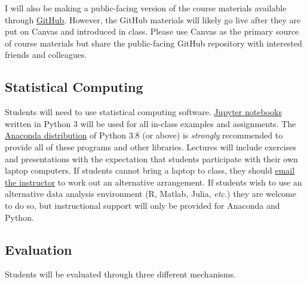 \documentclass[11pt]{memoir}
\begin{document}
I will also be making a public-facing version of the course materials available through \href{https://github.com/cuinfoscience/INFO5613-Fall2021}{GitHub}. However, the GitHub materials will likely go live after they are put on Canvas and introduced in class. Please use Canvas as the primary source of course materials but share the public-facing GitHub repository with interested friends and colleagues.

\subsection{Statistical Computing}
Students will need to use statistical computing software. \href{http://jupyter.org/}{Jupyter notebooks} written in Python 3 will be used for all in-class examples and assignments. The \href{https://www.continuum.io/why-anaconda}{Anaconda distribution} of Python 3.8 (or above) is \textit{strongly} recommended to provide all of these programs and other libraries. Lectures will include exercises and presentations with the expectation that students participate with their own laptop computers. If students cannot bring a laptop to class, they should \href{mailto:brian.keegan@colorado.edu}{email the instructor} to work out an alternative arrangement. If students wish to use an alternative data analysis environment (R, Matlab, Julia, \textit{etc.}) they are welcome to do so, but instructional support will only be provided for Anaconda and Python.

\subsection{Evaluation} 
Students will be evaluated through three different mechanisms. 
\end{document}
